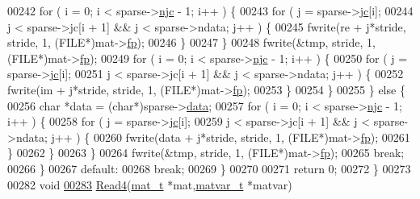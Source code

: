 \begin{DoxyCode}
{00242                 for ( i = 0; i < sparse->\hyperlink{group___m_a_t_a482d8e4b40aa975f0c1daf146ebe08a4}{njc} - 1; i++ ) \{
00243                     \textcolor{keywordflow}{for} ( j = sparse->\hyperlink{group___m_a_t_ad1e74cdc4f7eff1e47a670297c01da4b}{jc}[i];
00244                           j < sparse->jc[i + 1] && j < sparse->ndata; j++ ) \{
00245                         fwrite(re + j*stride, stride, 1, (FILE*)mat->\hyperlink{struct__mat__t_a85f562e407ca9ad4d2a6e14f839432b7}{fp});
00246                     \}
00247                 \}
00248                 fwrite(&tmp, stride, 1, (FILE*)mat->\hyperlink{struct__mat__t_a85f562e407ca9ad4d2a6e14f839432b7}{fp});
00249                 \textcolor{keywordflow}{for} ( i = 0; i < sparse->\hyperlink{group___m_a_t_a482d8e4b40aa975f0c1daf146ebe08a4}{njc} - 1; i++ ) \{
00250                     \textcolor{keywordflow}{for} ( j = sparse->\hyperlink{group___m_a_t_ad1e74cdc4f7eff1e47a670297c01da4b}{jc}[i];
00251                           j < sparse->jc[i + 1] && j < sparse->ndata; j++ ) \{
00252                         fwrite(im + j*stride, stride, 1, (FILE*)mat->\hyperlink{struct__mat__t_a85f562e407ca9ad4d2a6e14f839432b7}{fp});
00253                     \}
00254                 \}
00255             \} \textcolor{keywordflow}{else} \{
00256                 \textcolor{keywordtype}{char} *data = (\textcolor{keywordtype}{char}*)sparse->\hyperlink{group___m_a_t_ae2c648cb9eac4ce47f26cddb44246152}{data};
00257                 for ( i = 0; i < sparse->\hyperlink{group___m_a_t_a482d8e4b40aa975f0c1daf146ebe08a4}{njc} - 1; i++ ) \{
00258                     \textcolor{keywordflow}{for} ( j = sparse->\hyperlink{group___m_a_t_ad1e74cdc4f7eff1e47a670297c01da4b}{jc}[i];
00259                           j < sparse->jc[i + 1] && j < sparse->ndata; j++ ) \{
00260                         fwrite(data + j*stride, stride, 1, (FILE*)mat->\hyperlink{struct__mat__t_a85f562e407ca9ad4d2a6e14f839432b7}{fp});
00261                     \}
00262                 \}
00263             \}
00264             fwrite(&tmp, stride, 1, (FILE*)mat->\hyperlink{struct__mat__t_a85f562e407ca9ad4d2a6e14f839432b7}{fp});
00265             \textcolor{keywordflow}{break};
00266         \}
00267         \textcolor{keywordflow}{default}:
00268             \textcolor{keywordflow}{break};
00269     \}
00270 
00271     \textcolor{keywordflow}{return} 0;
00272 \}
00273 
00282 \textcolor{keywordtype}{void}
\hyperlink{mat4_8c_a48f37c81ddb08c15bd949ccd31a8aee9}{00283} \hyperlink{mat4_8c_a48f37c81ddb08c15bd949ccd31a8aee9}{Read4}(\hyperlink{struct__mat__t}{mat\_t} *mat,\hyperlink{group___m_a_t_structmatvar__t}{matvar\_t} *matvar)
}
\end{DoxyCode}
